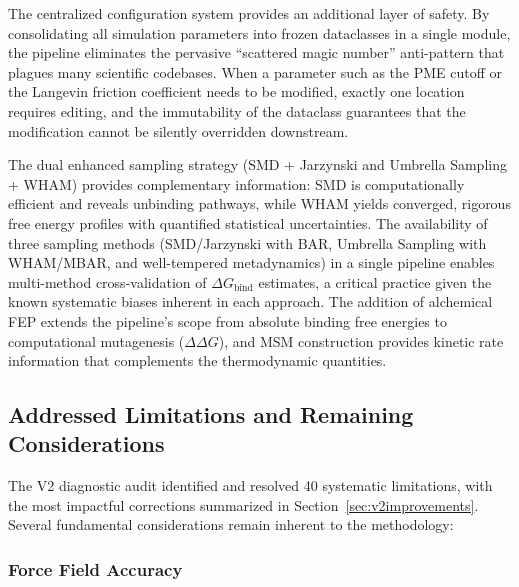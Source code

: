 \documentclass[conference]{IEEEtran}
\begin{document}
The centralized configuration system provides an additional layer of safety.
By consolidating all simulation parameters into frozen dataclasses in a
single module, the pipeline eliminates the pervasive ``scattered magic
number'' anti-pattern that plagues many scientific codebases.  When a
parameter such as the PME cutoff or the Langevin friction coefficient needs
to be modified, exactly one location requires editing, and the immutability
of the dataclass guarantees that the modification cannot be silently overridden
downstream.

The dual enhanced sampling strategy (SMD + Jarzynski and Umbrella Sampling +
WHAM) provides complementary information: SMD is computationally efficient
and reveals unbinding pathways, while WHAM yields converged, rigorous free
energy profiles with quantified statistical uncertainties.  The availability
of three sampling methods (SMD/Jarzynski with BAR, Umbrella Sampling with
WHAM/MBAR, and well-tempered metadynamics) in a single pipeline enables
multi-method cross-validation of $\Delta G_{\mathrm{bind}}$ estimates, a
critical practice given the known systematic biases inherent in each
approach.  The addition of alchemical FEP extends the pipeline's scope from
absolute binding free energies to computational mutagenesis
($\Delta\Delta G$), and MSM construction provides kinetic rate information
that complements the thermodynamic quantities.

\subsection{Addressed Limitations and Remaining Considerations}

The V2 diagnostic audit identified and resolved 40 systematic limitations,
with the most impactful corrections summarized in
Section~\ref{sec:v2improvements}.  Several fundamental considerations
remain inherent to the methodology:

\subsubsection{Force Field Accuracy}
\end{document}
